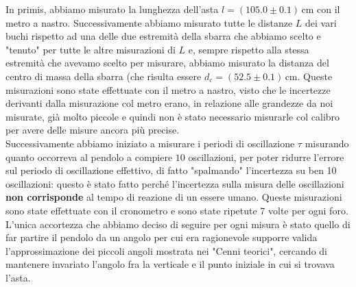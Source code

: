 \documentclass{article}
\begin{document}
In primis, abbiamo misurato la lunghezza dell'asta $l = (105.0 \pm 0.1) \,  \text{cm}$ con il metro a nastro. Successivamente abbiamo misurato tutte le distanze $L$ dei vari buchi rispetto ad una delle due estremità della sbarra che abbiamo scelto e "tenuto" per tutte le altre misurazioni di $L$ e, sempre rispetto alla stessa estremità che avevamo scelto per misurare, abbiamo misurato la distanza del centro di massa della sbarra (che risulta essere $d_c = (52.5 \pm 0.1) \, \text{cm}$. Queste misurazioni sono state effettuate con il metro a nastro, visto che le incertezze derivanti dalla misurazione col metro erano, in relazione alle grandezze da noi misurate, già molto piccole e quindi non è stato necessario misurarle col calibro per avere delle misure ancora più precise.\\
Successivamente abbiamo iniziato a misurare i periodi di oscillazione $\tau$ misurando quanto occorreva al pendolo a compiere $10$ oscillazioni, per poter ridurre l'errore sul periodo di oscillazione effettivo, di fatto "spalmando" l'incertezza su ben 10 oscillazioni: questo è stato fatto perché l'incertezza sulla misura delle oscillazioni \textbf{non corrisponde} al tempo di reazione di un essere umano. Queste misurazioni sono state effettuate con il cronometro e sono state ripetute 7 volte per ogni foro. \\
L'unica accortezza che abbiamo deciso di seguire per ogni misura è stato quello di far partire il pendolo da un angolo per cui era ragionevole supporre valida l'approssimazione dei piccoli angoli mostrata nei "Cenni teorici", cercando di mantenere invariato l'angolo fra la verticale e il punto iniziale in cui si trovava l'asta.
\end{document}
